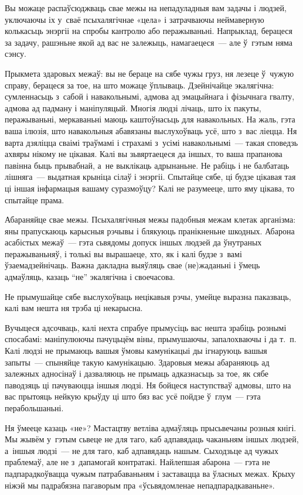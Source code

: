Вы можаце распаўсюджваць свае межы на непадуладныя вам задачы і людзей, уключаючы іх у~сваё псыхалягічнае «цела» і затрачваючы неймаверную колькасьць энэргіі на спробы кантролю або перажываньні. Напрыклад, берацеся за задачу, рашэньне якой ад вас не залежыць, намагаецеся~--- але ў~гэтым няма сэнсу. 

Прыкмета здаровых межаў: вы не бераце на сябе чужы груз, ня лезеце ў~чужую справу, берацеся за тое, на што можаце ўплываць. Дзейнічайце экалягічна: сумленнасьць з~сабой і навакольнымі, адмова ад эмацыйнага і фізычнага гвалту, адмова ад падману і маніпуляцый. Многія людзі лічаць, што іх пакуты, перажываньні, меркаваньні маюць каштоўнасьць для навакольных. На жаль, гэта ваша ілюзія, што навакольныя абавязаны выслухоўваць усё, што з~вас ліецца. Ня варта дзяліцца сваімі траўмамі і страхамі з~усімі навакольнымі~--- такая споведзь ахвяры нікому не цікавая. Калі вы зьвяртаецеся да іншых, то ваша прапанова павінна быць прывабнай, а~не выклікаць адрынаньне. Не рабіць і не балбатаць лішняга~--- выдатная крыніца сілаў і энэргіі. Спытайце сябе, ці будзе цікавая тая ці іншая інфармацыя вашаму суразмоўцу? Калі не разумееце, што яму цікава, то спытайце прама.

Абараняйце свае межы. Псыхалягічныя межы падобныя межам клетак арганізма: яны прапускаюць карысныя рэчывы і блякуюць пранікненьне шкодных. Абарона асабістых межаў~--- гэта сьвядомы допуск іншых людзей да ўнутраных перажываньняў, і толькі вы вырашаеце, хто, як і калі будзе з~вамі ўзаемадзейнічаць. Важна дакладна выяўляць свае (не)жаданьні і ўмець адмаўляць, казаць ``не'' экалягічна і своечасова.

Не прымушайце сябе выслухоўваць нецікавыя рэчы, умейце выразна паказваць, калі вам нешта ня трэба ці некарысна.

Вучыцеся адсочваць, калі нехта спрабуе прымусіць вас нешта зрабіць рознымі спосабамі: маніпулюючы пачуцьцём віны, прымушаючы, запалохваючы і да т.~п. Калі людзі не прымаюць вашыя ўмовы камунікацыі ды ігнаруюць вашыя запыты~--- спыняйце такую камунікацыю. Здаровыя межы абараняюць ад залежных адносінаў і дазваляюць не прымаць адказнасьць за тое, як сябе паводзяць ці пачуваюцца іншыя людзі. Ня бойцеся наступстваў адмовы, што на вас прытояць нейкую крыўду ці што бяз вас усё пойдзе ў~глум~--- гэта перабольшаньні.

Ня ўмееце казаць «не»? Мастацтву ветліва адмаўляць прысьвечаны розныя кнігі. Мы жывём у~гэтым сьвеце не для таго, каб адпавядаць чаканьням іншых людзей, а~іншыя людзі~--- не для таго, каб адпавядаць нашым. Сыходзьце ад чужых праблемаў, але не з~дапамогай контратакі. Найлепшая абарона~--- гэта не падпарадкоўвацца чужым патрабаваньням і заставацца ва ўласных межах. Крыху ніжэй мы падрабязна пагаворым пра «ўсьвядомленае непадпарадкаваньне».

